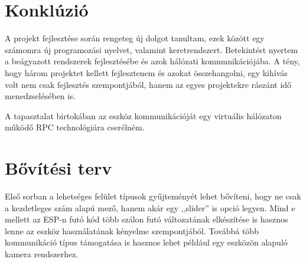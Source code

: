 \documentclass{thesis-ekf}
\theoremstyle{definition}
\theoremstyle{remark}
\begin{document}
	\section*{Konklúzió}
	A projekt fejlesztése során rengeteg új dolgot tanultam, ezek között egy számomra új programozási nyelvet, valamint keretrendszert. Betekintést nyertem a beágyazott rendszerek fejlesztésébe és azok hálózati kommunikációjába. A tény, hogy három projektet kellett fejlesztenem és azokat összehangolni, egy kihívás volt nem csak fejlesztés szempontjából, hanem az egyes projektekre rászánt idő menedzselésében is.
	
	A tapasztalat birtokában az eszköz kommunikációját egy virtuális hálózaton működő RPC technológiára cserélném.
	\section*{Bővítési terv}
	Első sorban a lehetséges felület típusok gyűjteményét lehet bővíteni, hogy ne csak a kezdetleges szám alapú mező, hanem akár egy ,,slider'' is opció legyen. Mind e mellett az ESP-n futó kód több szálon futó változatának elkészítése is hasznos lenne az eszköz használatának kényelme szempontjából. Továbbá több kommunikáció típus támogatása is hasznos lehet például egy eszközön alapuló kamera rendszerhez.
\end{document}
